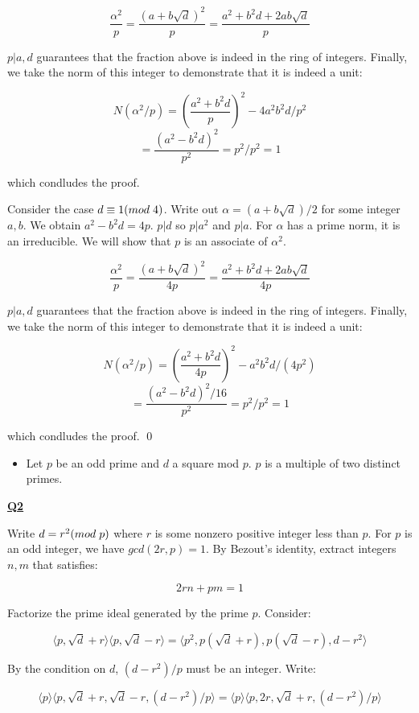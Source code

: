 \documentclass{article}
\newcommand{\new}[1]{
    \vspace{2mm}
    \noindent
    \textbf{
    \underline{#1}}
}
\def\_{{\hspace{1mm}}}
\newcommand{\<}{{
    \langle
}}
\def\>{{
    \rangle
}}
\begin{document}
\[
    \frac{\alpha^2}{p} = 
    \frac{(a+b\sqrt{d})^2}{p} = 
    \frac{a^2+b^2d+2ab\sqrt{d}}{p}
\]

$p|a, d$ guarantees that the fraction above is indeed in the ring of 
integers. Finally, we take the norm of this integer to demonstrate 
that it is indeed a unit:

\[
    N(\alpha^2/p) = 
    \left(
        \frac{a^2+b^2d}{p}
    \right)^2
    -4 a^2 b^2d/p^2
\]
\[
    = \frac{(a^2 - b^2d)^2}{p^2}
    = p^2/p^2 = 1
\]

which condludes the proof. 

Consider the case $d \equiv 1 (mod \_ 4)$. 
Write out $\alpha  = (a+b\sqrt{d})/2$ for some integer $a, b$. We obtain 
$a^2-b^2d = 4p$. $p|d$ so $p|a^2$ and $p|a$. For $\alpha$ has a prime norm, it is an irreducible. 
We will show that $p$ is an associate of $\alpha^2$. 

\[
    \frac{\alpha^2}{p} = 
    \frac{(a+b\sqrt{d})^2}{4p} = 
    \frac{a^2+b^2d+2ab\sqrt{d}}{4p}
\]

$p|a, d$ guarantees that the fraction above is indeed in the ring of 
integers. Finally, we take the norm of this integer to demonstrate 
that it is indeed a unit:

\[
    N(\alpha^2/p) = 
    \left(
        \frac{a^2+b^2d}{4p}
    \right)^2
    -a^2 b^2d/(4p^2)
\]
\[
    = \frac{(a^2 - b^2d)^2/16}{p^2}
    = p^2/p^2 = 1
\]

which condludes the proof.
\qed

\newpage

\begin{itemize}
    \item Let $p$ be an odd prime and $d$ a square mod $p$. 
    $p$ is a multiple of two distinct primes. 
\end{itemize}

\new{Q2}
Write $d = r^2 (mod\_ p)$ where $r$ is some 
nonzero positive integer less than $p$. For $p$ is 
an odd integer, we have $gcd(2r, p) = 1$. By Bezout's identity, 
extract integers $n, m$ that satisfies:

\[
    2rn + pm = 1
\]

Factorize the prime ideal generated by the prime $p$. Consider:

\[
    \<p, \sqrt{d} + r\>\<p, \sqrt{d} - r\>
    = \<p^2, p(\sqrt{d}+r), p(\sqrt{d} - r), d - r^2\>
\]

By the condition on $d$, $(d-r^2)/p$ must be an integer. Write:

\[
    \<p\>\<p, \sqrt{d}+r, \sqrt{d}-r, (d-r^2)/p\>
    =
    \<p\>\<p, 2r, \sqrt{d}+r, (d-r^2)/p\>
\]
\end{document}
